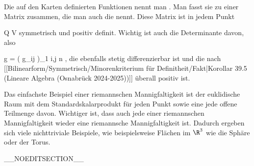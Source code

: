 Die auf den Karten definierten Funktionen
 nennt man
 {} {}
 {.} Man fasst sie zu einer Matrix
 zusammen, die man auch die  {}
 {} {}
nennt. Diese Matrix ist in jedem Punkt

\mavergleichskette
{\vergleichskette
{ Q
}
{ \in }{ V
}
{  }{
}
{    }{
}
{   }{
}
}
{}{}{}
symmetrisch und positiv definit. Wichtig ist auch die Determinante davon, also

\mavergleichskettedisp
{\vergleichskette
{ g
}
{ =} { \det  \left(  g_{ij}  \right)_{1 \leq i,j \leq n}
}
{ } {
}
{ } {
}
{ } {
}
}
{}{}{,}
die ebenfalls stetig differenzierbar ist und die nach
[[Bilinearform/Symmetrisch/Minorenkriterium für Definitheit/Fakt|Korollar 39.5 (Lineare Algebra (Osnabrück 2024-2025))]]
überall positiv ist.

Das einfachste Beispiel einer riemannschen Mannigfaltigkeit ist der euklidische Raum
 mit dem Standardskalarprodukt für jeden Punkt
 {} {}
sowie eine jede offene Teilmenge davon. Wichtiger ist, dass auch jede
einer riemannschen Mannigfaltigkeit wieder eine riemannsche Mannigfaltigkeit ist. Dadurch ergeben sich viele nichttriviale Beispiele, wie beispielsweise Flächen im $\R^3$ wie die Sphäre oder der Torus.

__NOEDITSECTION__

